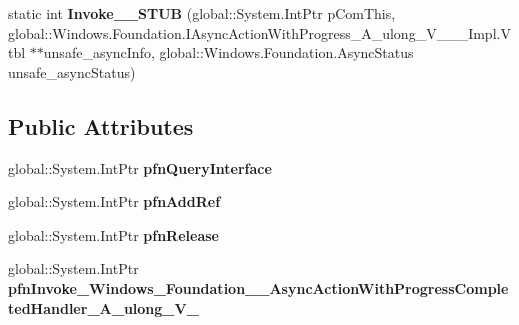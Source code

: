 \begin{DoxyCompactItemize}
\item 
\mbox{\label{struct_windows_1_1_foundation_1_1_async_action_with_progress_completed_handler___a__ulong___v_______impl_1_1_vtbl_ae5ff28298bdd095b0ecfd86fd13c7348}} 
static int {\bfseries Invoke\+\_\+\+\_\+\+S\+T\+UB} (global\+::\+System.\+Int\+Ptr p\+Com\+This, global\+::\+Windows.\+Foundation.\+I\+Async\+Action\+With\+Progress\+\_\+\+A\+\_\+ulong\+\_\+\+V\+\_\+\+\_\+\+\_\+\+Impl.\+Vtbl $\ast$$\ast$unsafe\+\_\+async\+Info, global\+::\+Windows.\+Foundation.\+Async\+Status unsafe\+\_\+async\+Status)
\end{DoxyCompactItemize}
\subsection*{Public Attributes}
\begin{DoxyCompactItemize}
\item 
\mbox{\label{struct_windows_1_1_foundation_1_1_async_action_with_progress_completed_handler___a__ulong___v_______impl_1_1_vtbl_a3d36ffd8a8320e21f0861d88d2f8b2ce}} 
global\+::\+System.\+Int\+Ptr {\bfseries pfn\+Query\+Interface}
\item 
\mbox{\label{struct_windows_1_1_foundation_1_1_async_action_with_progress_completed_handler___a__ulong___v_______impl_1_1_vtbl_aee714367bc9208eb6aa04ef9b630a8c8}} 
global\+::\+System.\+Int\+Ptr {\bfseries pfn\+Add\+Ref}
\item 
\mbox{\label{struct_windows_1_1_foundation_1_1_async_action_with_progress_completed_handler___a__ulong___v_______impl_1_1_vtbl_af90b39a869ee73d799b44039eb89bdc9}} 
global\+::\+System.\+Int\+Ptr {\bfseries pfn\+Release}
\item 
\mbox{\label{struct_windows_1_1_foundation_1_1_async_action_with_progress_completed_handler___a__ulong___v_______impl_1_1_vtbl_affe58047bab20b767db2a8c03bc34cca}} 
global\+::\+System.\+Int\+Ptr {\bfseries pfn\+Invoke\+\_\+\+Windows\+\_\+\+Foundation\+\_\+\+\_\+\+Async\+Action\+With\+Progress\+Completed\+Handler\+\_\+\+A\+\_\+ulong\+\_\+\+V\+\_\+}
\end{DoxyCompactItemize}
